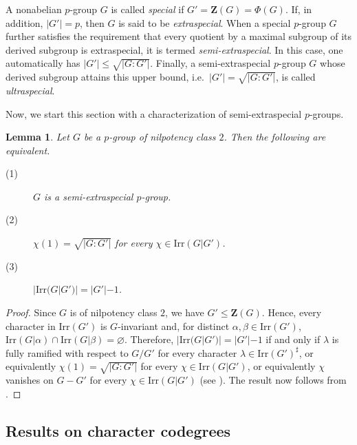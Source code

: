 \documentclass[9pt]{article}
\newtheorem{lem}{\bf Lemma}[section]
\begin{document}
A nonabelian $p$-group $G$ is called \emph{special} if $G'=\mathbf{Z}(G)=\Phi(G)$.  
If, in addition, $|G'|=p$, then $G$ is said to be \emph{extraspecial}.  
When a special $p$-group $G$ further satisfies the requirement that every quotient by a maximal subgroup of its derived subgroup is extraspecial, it is termed \emph{semi-extraspecial}.
In this case, one automatically has $|G'|\le\sqrt{|G:G'|}$.  
Finally, a semi-extraspecial $p$-group $G$ whose derived subgroup attains this upper bound, i.e.\ $|G'|=\sqrt{|G:G'|}$, is called \emph{ultraspecial}.



Now, we start this section with a characterization of semi-extraspecial $p$-groups.


\begin{lem}\label{lem: semi-extra}
    Let $G$ be a $p$-group of nilpotency class $2$.
	Then 
	the following are equivalent.
	\begin{description}
		\item [(1)] $G$ is a semi-extraspecial $p$-group.
		\item [(2)] $\chi(1)=\sqrt{|G:G'|}$ for every $\chi \in \mathrm{Irr}(G|G')$.
		\item [(3)] $|\mathrm{Irr}(G|G')|=|G'|-1$.
	\end{description}
\end{lem}
\begin{proof}
	Since $G$ is of nilpotency class $2$, we have $G'\leq \mathbf{Z}(G)$.
	Hence, every character in $\mathrm{Irr}(G')$ is $G$-invariant and, 
	for distinct $\alpha,\beta\in \mathrm{Irr}(G')$,
	$\mathrm{Irr}(G|\alpha)\cap \mathrm{Irr}(G|\beta)=\varnothing$.
	Therefore, $|\mathrm{Irr}(G|G')|=|G'|-1$ 
    if and only if 
	$\lambda$ is fully ramified with respect to $G/G'$ for
	every character $\lambda\in \mathrm{Irr}(G')^\sharp$,
	or equivalently $\chi(1)=\sqrt{|G:G'|}$ for every $\chi \in \mathrm{Irr}(G|G')$,
	or equivalently $\chi$ vanishes on $G-G'$ for every $\chi \in \mathrm{Irr}(G|G')$ (see \cite[Problem 6.3 and Lemma~2.29]{isaacs1994}). 
	The result now follows from \cite[Theorems 1, 2]{lewis2017}.
\end{proof}















\subsection{Results on character codegrees}
\end{document}
